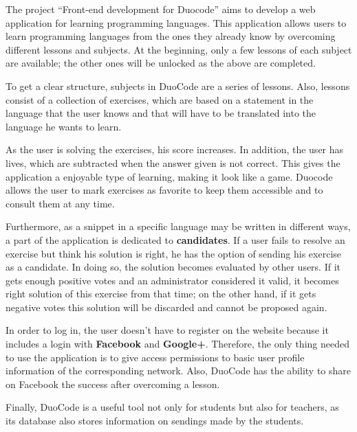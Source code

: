 The project ``Front-end development for Duocode'' aims to develop a web application for learning programming languages. This application allows users to learn programming languages from the ones they already know by overcoming different lessons and subjects. At the beginning, only a few lessons of each subject are available; the other ones will be unlocked as the above are completed.

To get a clear structure, subjects in DuoCode are a series of lessons. Also, lessons consist of a collection of exercises, which are based on a statement in the language that the user knows and that will have to be translated into the language he wants to learn.

As the user is solving the exercises, his score increases. In addition, the user has lives, which are subtracted when the answer given is not correct. This gives the application a enjoyable type of learning, making it look like a game. Duocode allows the user to mark exercises as favorite to keep them accessible and to consult them at any time. 

Furthermore, as a snippet in a specific language may be written in different ways, a part of the application is dedicated to \textbf{candidates}. If a user fails to resolve an exercise but think his solution is right, he has the option of sending his exercise as a candidate. In doing so, the solution becomes evaluated by other users. If it gets enough positive votes and an administrator considered it valid, it becomes right solution of this exercise from that time; on the other hand, if it gets negative votes this solution will be discarded and cannot be proposed again.

In order to log in, the user doesn't have to register on the website because it includes a login with \textbf{Facebook} and \textbf{Google+}. Therefore, the only thing needed to use the application is to give access permissions to basic user profile information of the corresponding network. Also, DuoCode has the ability to share on Facebook the success after overcoming a lesson.

Finally, DuoCode is a useful tool not only for students but also for teachers, as its database also stores information on sendings made by the students.